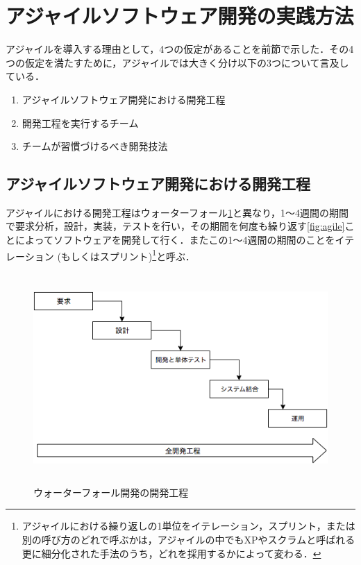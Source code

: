 \section{アジャイルソフトウェア開発の実践方法}

アジャイルを導入する理由として，4つの仮定があることを前節で示した．その4つの仮定を満たすために，アジャイルでは大きく分け以下の3つについて言及している．

\begin{enumerate}
  \item アジャイルソフトウェア開発における開発工程
  \item 開発工程を実行するチーム
  \item チームが習慣づけるべき開発技法
\end{enumerate}

\subsection{アジャイルソフトウェア開発における開発工程}

アジャイルにおける開発工程はウォーターフォール\ref{fig:waterfall}と異なり，1〜4週間の期間で要求分析，設計，実装，テストを行い，その期間を何度も繰り返す\ref{fig:agile}ことによってソフトウェアを開発して行く．またこの1〜4週間の期間のことをイテレーション (もしくはスプリント)\footnote{アジャイルにおける繰り返しの1単位をイテレーション，スプリント，または別の呼び方のどれで呼ぶかは，アジャイルの中でもXPやスクラムと呼ばれる更に細分化された手法のうち，どれを採用するかによって変わる．}と呼ぶ．

\begin{figure}[H]
\centering
\includegraphics[height=8cm]{./assets/images/waterfall.png}
\caption{ウォーターフォール開発の開発工程}
\label{fig:waterfall}
\end{figure}

